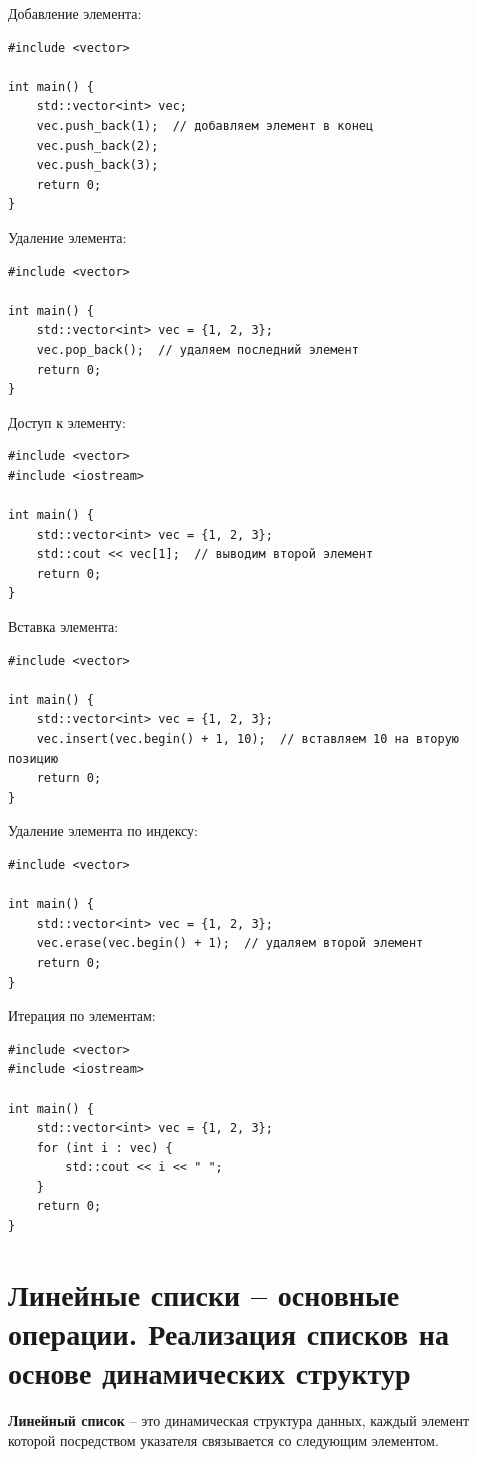 Добавление элемента:
\begin{verbatim}
#include <vector>

int main() {
    std::vector<int> vec;
    vec.push_back(1);  // добавляем элемент в конец
    vec.push_back(2);
    vec.push_back(3);
    return 0;
}
\end{verbatim}

Удаление элемента:
\begin{verbatim}
#include <vector>

int main() {
    std::vector<int> vec = {1, 2, 3};
    vec.pop_back();  // удаляем последний элемент
    return 0;
}
\end{verbatim}

Доступ к элементу:
\begin{verbatim}
#include <vector>
#include <iostream>

int main() {
    std::vector<int> vec = {1, 2, 3};
    std::cout << vec[1];  // выводим второй элемент
    return 0;
}
\end{verbatim}

Вставка элемента:
\begin{verbatim}
#include <vector>

int main() {
    std::vector<int> vec = {1, 2, 3};
    vec.insert(vec.begin() + 1, 10);  // вставляем 10 на вторую позицию
    return 0;
}
\end{verbatim}

Удаление элемента по индексу:
\begin{verbatim}
#include <vector>

int main() {
    std::vector<int> vec = {1, 2, 3};
    vec.erase(vec.begin() + 1);  // удаляем второй элемент
    return 0;
}
\end{verbatim}

Итерация по элементам:
\begin{verbatim}
#include <vector>
#include <iostream>

int main() {
    std::vector<int> vec = {1, 2, 3};
    for (int i : vec) {
        std::cout << i << " ";
    }
    return 0;
}
\end{verbatim}

\section{Линейные списки – основные операции. Реализация списков на основе динамических структур}

\textbf{Линейный список} -- это динамическая структура данных, каждый элемент которой посредством указателя связывается со следующим элементом.

